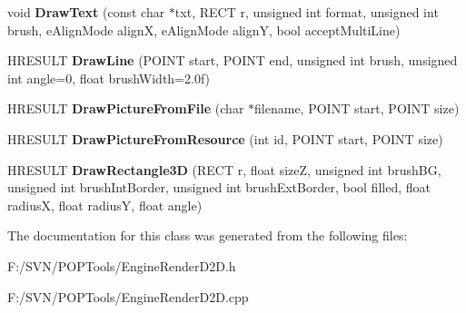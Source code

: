 \begin{DoxyCompactItemize}
\item 
\hypertarget{class_engine_render_d2_d_a3bf4daa2c3f0e5a1d426a7eaabd1351c}{void {\bfseries Draw\-Text} (const char $\ast$txt, R\-E\-C\-T r, unsigned int format, unsigned int brush, e\-Align\-Mode align\-X, e\-Align\-Mode align\-Y, bool accept\-Multi\-Line)}\label{class_engine_render_d2_d_a3bf4daa2c3f0e5a1d426a7eaabd1351c}

\item 
\hypertarget{class_engine_render_d2_d_ac380ee5c9c67c78c3e2aa8fce29c29e5}{H\-R\-E\-S\-U\-L\-T {\bfseries Draw\-Line} (P\-O\-I\-N\-T start, P\-O\-I\-N\-T end, unsigned int brush, unsigned int angle=0, float brush\-Width=2.\-0f)}\label{class_engine_render_d2_d_ac380ee5c9c67c78c3e2aa8fce29c29e5}

\item 
\hypertarget{class_engine_render_d2_d_adfd6dc6da9cdb4160ab718b9b5508c67}{H\-R\-E\-S\-U\-L\-T {\bfseries Draw\-Picture\-From\-File} (char $\ast$filename, P\-O\-I\-N\-T start, P\-O\-I\-N\-T size)}\label{class_engine_render_d2_d_adfd6dc6da9cdb4160ab718b9b5508c67}

\item 
\hypertarget{class_engine_render_d2_d_a097a7af4ad2ce1bf98738df5786b8265}{H\-R\-E\-S\-U\-L\-T {\bfseries Draw\-Picture\-From\-Resource} (int id, P\-O\-I\-N\-T start, P\-O\-I\-N\-T size)}\label{class_engine_render_d2_d_a097a7af4ad2ce1bf98738df5786b8265}

\item 
\hypertarget{class_engine_render_d2_d_a7add6bcd954002a40a47545833704099}{H\-R\-E\-S\-U\-L\-T {\bfseries Draw\-Rectangle3\-D} (R\-E\-C\-T r, float size\-Z, unsigned int brush\-B\-G, unsigned int brush\-Int\-Border, unsigned int brush\-Ext\-Border, bool filled, float radius\-X, float radius\-Y, float angle)}\label{class_engine_render_d2_d_a7add6bcd954002a40a47545833704099}

\end{DoxyCompactItemize}


The documentation for this class was generated from the following files\-:\begin{DoxyCompactItemize}
\item 
F\-:/\-S\-V\-N/\-P\-O\-P\-Tools/Engine\-Render\-D2\-D.\-h\item 
F\-:/\-S\-V\-N/\-P\-O\-P\-Tools/Engine\-Render\-D2\-D.\-cpp\end{DoxyCompactItemize}
